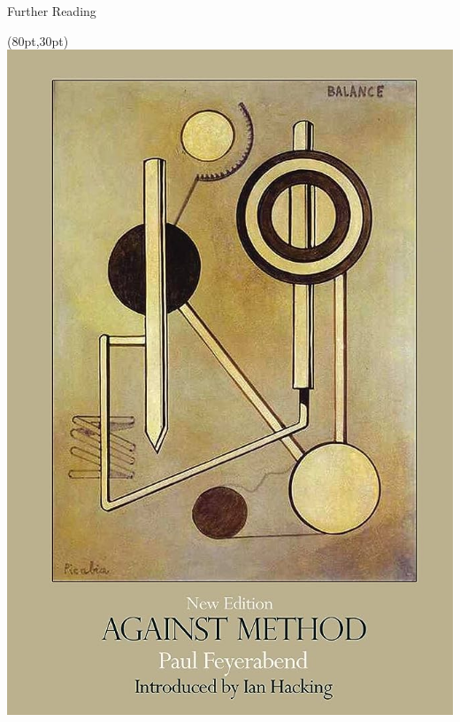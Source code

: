 \documentclass{beamer}
\begin{document}
\begin{frame}{Further Reading}
	\begin{textblock*}{60pt}(80pt,30pt)
		\includegraphics[width=1\textwidth]{../images/againstmethod.jpg}
	\end{textblock*}


\end{frame}
\end{document}

